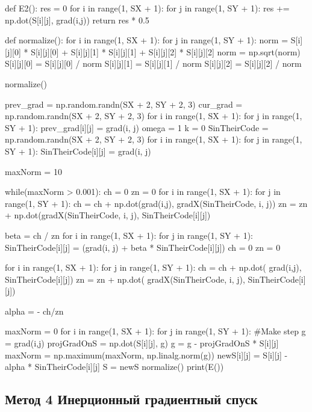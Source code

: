 \documentclass[ 12pt,x11names]{article}
\begin{document}
\begin{python}
def E2():
    res = 0
    for i in range(1, SX + 1):
        for j in range(1, SY + 1):
            res += np.dot(S[i][j], grad(i,j))
    return res * 0.5

def normalize():
    for i in range(1, SX + 1):
        for j in range(1, SY + 1):
            norm = S[i][j][0] * S[i][j][0]
                 + S[i][j][1] * S[i][j][1]
                 + S[i][j][2] * S[i][j][2]
            norm = np.sqrt(norm)
            S[i][j][0] = S[i][j][0] / norm
            S[i][j][1] = S[i][j][1] / norm
            S[i][j][2] = S[i][j][2] / norm

normalize()

prev_grad =  np.random.randn(SX + 2, SY + 2, 3)
cur_grad = np.random.randn(SX + 2, SY + 2, 3)
for i in range(1, SX + 1):
    for j in range(1, SY + 1):
        prev_grad[i][j] = grad(i, j)
omega = 1
k = 0
SinTheirCode = np.random.randn(SX + 2, SY + 2, 3)
for i in range(1, SX + 1):
    for j in range(1, SY + 1):
        SinTheirCode[i][j] = grad(i, j)

maxNorm = 10

while(maxNorm > 0.001):
    ch = 0
    zn = 0
    for i in range(1, SX + 1):
        for j in range(1, SY + 1):
            ch = ch + np.dot(grad(i,j), gradX(SinTheirCode, i, j))
            zn = zn + np.dot(gradX(SinTheirCode, i, j),
                             SinTheirCode[i][j])

    beta = ch / zn
    for i in range(1, SX + 1):
        for j in range(1, SY + 1):
            SinTheirCode[i][j] = (grad(i, j)
                                + beta * SinTheirCode[i][j])
    ch = 0
    zn = 0

    for i in range(1, SX + 1):
        for j in range(1, SY + 1):
            ch = ch + np.dot(
                grad(i,j), SinTheirCode[i][j])
            zn = zn + np.dot(
                gradX(SinTheirCode, i, j), SinTheirCode[i][j])


    alpha  = - ch/zn

    maxNorm =  0
    for i in range(1, SX + 1):
        for j in range(1, SY + 1):
            #Make step
            g = grad(i,j)
            projGradOnS = np.dot(S[i][j], g)
            g = g - projGradOnS * S[i][j]
            maxNorm = np.maximum(maxNorm, np.linalg.norm(g))
            newS[i][j] = S[i][j] - alpha * SinTheirCode[i][j]
    S = newS
    normalize()
print(E())

 \end{python}

\subsection{Метод 4 Инерционный градиентный спуск}
\end{document}
